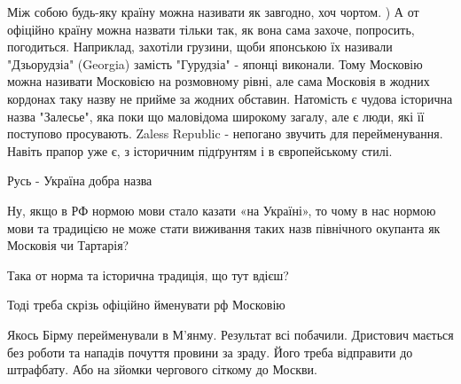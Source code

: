 \begin{itemize}
Між собою будь-яку країну можна називати як завгодно, хоч чортом. ) А от
офіційно країну можна назвати тільки так, як вона сама захоче, попросить,
погодиться. Наприклад, захотіли грузини, щоби японською їх називали
"Дзьорудзіа" (Georgia) замість "Гурудзіа" - японці виконали. Тому Московію
можна називати Московією на розмовному рівні, але сама Московія в жодних
кордонах таку назву не прийме за жодних обставин. Натомість є чудова історична
назва "Залесье", яка поки що маловідома широкому загалу, але є люди, які її
поступово просувають. Zaless Republic - непогано звучить для перейменування.
Навіть прапор уже є, з історичним підґрунтям і в європейському стилі.


 
Русь - Україна добра назва

 

Ну, якщо в РФ нормою мови стало казати «на Україні», то чому в нас нормою мови
та традицією не може стати виживання таких назв північного окупанта як Московія
чи Тартарія?

Така от норма та історична традиція, що тут вдієш?


 
Тоді треба скрізь офіційно йменувати рф Московію

 


Якось Бірму перейменували в М'янму. Результат всі побачили. Дристович мається
без роботи та нападів почуття провини за зраду. Його треба відправити до
штрафбату. Або на зйомки чергового сіткому до Москви.


\end{itemize}
